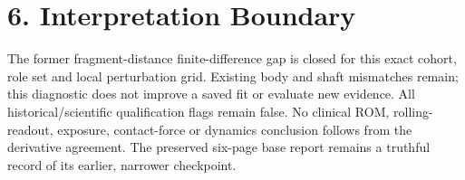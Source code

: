 \documentclass[11pt,a4paper]{article}
\begin{document}
\section*{6. Interpretation Boundary}
The former fragment-distance finite-difference gap is closed for this exact
cohort, role set and local perturbation grid. Existing body and shaft mismatches
remain; this diagnostic does not improve a saved fit or evaluate new evidence.
All historical/scientific qualification flags remain false. No clinical ROM,
rolling-readout, exposure, contact-force or dynamics conclusion follows from
the derivative agreement. The preserved six-page base report remains a truthful
record of its earlier, narrower checkpoint.
\end{document}
